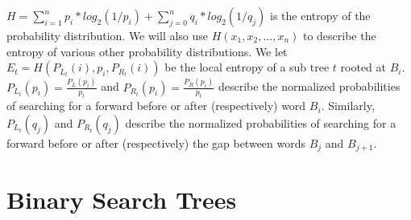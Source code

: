 \documentclass[letterpaper,12pt,titlepage,oneside,final]{book}
\theoremstyle{plain}
\begin{document}
$H = \sum_{i=1}^{n} p_i*log_2(1/p_i) + \sum_{j=0}^{n} q_i*log_2(1/q_j)$ is the entropy of the probability distribution. We will also use $H(x_1,x_2,...,x_n)$ to describe the entropy of various other probability distributions. We let $E_t=H(P_{L_t}(i), p_i, P_{R_t}(i))$ be the local entropy of a sub tree $t$ rooted at $B_i$. $P_{L_t}(p_i)=\frac{P_L(p_i)}{p_t}$ and $P_{R_t}(p_i)=\frac{P_R(p_i)}{p_t}$ describe the normalized probabilities of searching for a forward before or after (respectively) word $B_i$. Similarly, $P_{L_t}(q_j)$ and $P_{R_t}(q_j)$ describe the normalized probabilities of searching for a forward before or after (respectively) the gap between words $B_j$ and $B_{j+1}$.

\section{Binary Search Trees}
\end{document}
